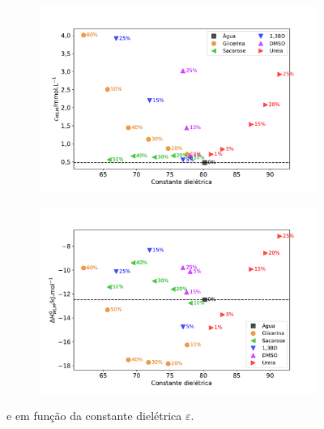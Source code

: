 		\begin{figure}[h]
			\begin{subfigure}[t]{0.5\textwidth}
				\centering
				\includegraphics[width=\textwidth]{imagens/itc/Cwlm_por_eps}
				\caption{\cwlm}
				\label{fig:cwlm_por_eps}
			\end{subfigure} %
			\begin{subfigure}[t]{0.5\textwidth}
				\centering
				\includegraphics[width=\textwidth]{imagens/itc/DHwlm_por_eps}
				\caption{\DHwlm}
				\label{fig:dhwlm_por_eps}
			\end{subfigure}
			
			\caption{\cwlm{} e \DHwlm{} em função da constante dielétrica \(\varepsilon\).}
			\label{fig:cwlm_dhwlm_por_eps}
		\end{figure}
		

